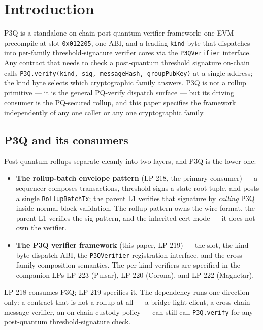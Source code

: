 \section{Introduction}

P3Q is a standalone on-chain post-quantum verifier framework: one
EVM precompile at slot \texttt{0x012205}, one ABI, and a leading
\texttt{kind} byte that dispatches into per-family
threshold-signature verifier cores via the \texttt{P3QVerifier}
interface. Any contract that needs to check a post-quantum
threshold signature on-chain calls
\texttt{P3Q.verify(kind, sig, messageHash, groupPubKey)} at a
single address; the kind byte selects which cryptographic family
answers. P3Q is not a rollup primitive --- it is the general
PQ-verify dispatch surface --- but its driving consumer is the
PQ-secured rollup, and this paper specifies the framework
independently of any one caller or any one cryptographic family.

\subsection{P3Q and its consumers}

Post-quantum rollups separate cleanly into two layers, and P3Q is
the lower one:

\begin{itemize}[leftmargin=2em,nosep]
\item \textbf{The rollup-batch envelope pattern} (LP-218, the
  primary consumer) --- a sequencer composes transactions,
  threshold-signs a state-root tuple, and posts a single
  \texttt{RollupBatchTx}; the parent L1 verifies that signature by
  \emph{calling} P3Q inside normal block validation. The rollup
  pattern owns the wire format, the parent-L1-verifies-the-sig
  pattern, and the inherited cert mode --- it does not own the
  verifier.
\item \textbf{The P3Q verifier framework} (this paper, LP-219) ---
  the slot, the kind-byte dispatch ABI, the \texttt{P3QVerifier}
  registration interface, and the cross-family composition
  semantics. The per-kind verifiers are specified in the companion
  LPs LP-223 (Pulsar), LP-220 (Corona), and LP-222 (Magnetar).
\end{itemize}

LP-218 consumes P3Q; LP-219 specifies it. The dependency runs one
direction only: a contract that is not a rollup at all --- a
bridge light-client, a cross-chain message verifier, an
on-chain custody policy --- can still call \texttt{P3Q.verify} for
any post-quantum threshold-signature check.

